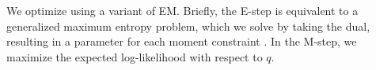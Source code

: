 We optimize  using a variant of EM.
Briefly, the E-step is equivalent to a generalized maximum entropy problem,
which we solve by taking the dual, resulting in a parameter for each moment constraint .
In the M-step, we maximize the expected log-likelihood with respect to $q$.

